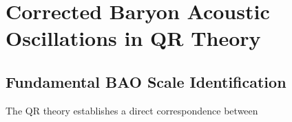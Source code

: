 
\section{Corrected Baryon Acoustic Oscillations in QR Theory}
\label{sec:bao_fix}

\subsection{Fundamental BAO Scale Identification}
The QR theory establishes a direct correspondence between 